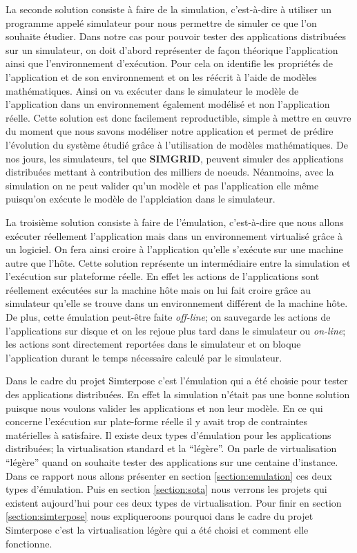 La seconde solution consiste à faire de la simulation, c'est-à-dire à utiliser un programme appelé simulateur pour nous permettre de simuler ce que l'on souhaite étudier. Dans notre cas pour pouvoir tester des applications distribuées sur un simulateur, on doit d'abord représenter de façon théorique l'application ainsi que l'environnement d'exécution. Pour cela on identifie les propriétés de l'application et de son environnement et on les réécrit à l'aide de modèles mathématiques. Ainsi on va exécuter dans le simulateur le modèle de l'application dans un environnement également modélisé et non l'application réelle. Cette solution est donc facilement reproductible, simple à mettre en \oe uvre du moment que nous savons modéliser notre application et permet de prédire l'évolution du système étudié grâce à l'utilisation de modèles mathématiques. De nos jours, les simulateurs, tel que  \textbf{SIMGRID}\cite{MARTIN:SimGrid}, peuvent simuler des applications distribuées mettant à contribution des milliers de noeuds. Néanmoins, avec la simulation on ne peut valider qu'un modèle et pas l'application elle même puisqu'on exécute le modèle de l'applciation dans le simulateur. 

La troisième solution consiste à faire de l'émulation, c'est-à-dire que nous allons exécuter réellement l'application mais dans un environnement virtualisé grâce à un logiciel. On fera ainsi croire à l'application qu'elle s'exécute sur une machine autre que l'hôte. Cette solution représente un intermédiaire entre la simulation et l'exécution sur plateforme réelle. En effet les actions de l'applications sont réellement exécutées sur la machine hôte mais on lui fait croire grâce au simulateur qu'elle se trouve dans un environnement différent de la machine hôte. De plus, cette émulation peut-être faite \textit{off-line}; on sauvegarde les actions de l'applications sur disque et on les rejoue plus tard dans le simulateur ou \textit{on-line}; les actions sont directement reportées dans le simulateur et on bloque l'application durant le temps nécessaire calculé par le simulateur.

Dans le cadre du projet Simterpose c'est l'émulation qui a été choisie pour tester des applications distribuées. En effet la simulation n'était pas une bonne solution puisque nous voulons valider les applications et non leur modèle. En ce qui concerne l'exécution sur plate-forme réelle il y avait trop de contraintes matérielles à satisfaire. Il existe deux types d'émulation pour les applications distribuées; la virtualisation standard et la ``légère''. On parle de virtualisation ``légère'' quand on souhaite tester des applications sur une centaine d'instance. Dans ce rapport nous allons présenter en section \ref{section:emulation} ces deux types d'émulation. Puis en section \ref{section:sota} nous verrons les projets qui existent aujourd'hui pour ces deux types de virtualisation. Pour finir en section \ref{section:simterpose} nous expliqueroons pourquoi dans le cadre du projet Simterpose c'est la virtualisation légère qui a été choisi et comment elle fonctionne.


